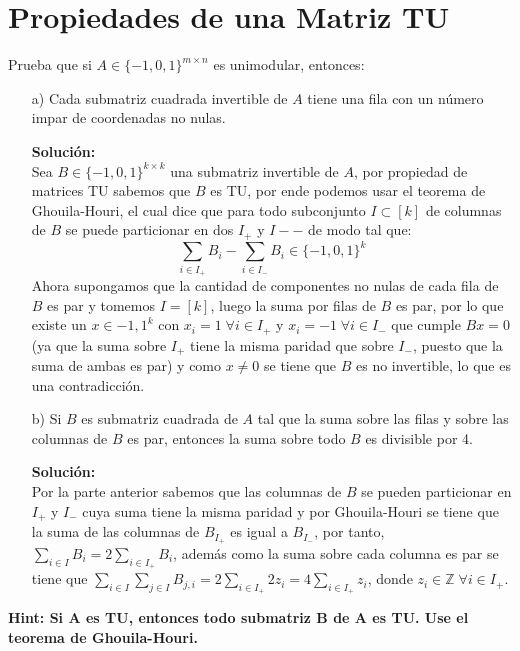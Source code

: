 \documentclass[10pt]{article}
\theoremstyle{plain}
\theoremstyle{definition}
\begin{document}
\section{Propiedades de una Matriz TU}
Prueba que si $A\in\{-1,0,1\}^{m\times n}$ es unimodular, entonces:
\begin{itemize}
    \item[a)] Cada submatriz cuadrada invertible de $A$ tiene una fila con un número impar de coordenadas no nulas.
    
    \textbf{Solución:}\\
    Sea $B\in \{-1,0,1\}^{k\times k}$ una submatriz invertible de $A$, por propiedad de matrices TU sabemos que $B$ es TU, por ende podemos usar el teorema de Ghouila-Houri, el cual dice que para todo subconjunto $I\subset[k]$ de columnas de $B$ se puede particionar en dos $I_{+}$ y $I-{-}$ de modo tal que:
    \begin{equation*}
        \sum_{i\in I_{+}}B_{i}- \sum_{i\in I_{-}}B_{i} \in \{-1, 0, 1\}^{k}
    \end{equation*}
    Ahora supongamos que la cantidad de componentes no nulas de cada fila de $B$ es par y tomemos $I=[k]$, luego la suma por filas de $B$ es par, por lo que existe un $x\in{-1,1}^{k}$ con $x_{i} = 1 \;\forall i \in I_{+}$ y $x_{i} = -1 \;\forall i \in I_{-}$ que cumple $Bx=0$ (ya que la suma sobre $I_{+}$ tiene la misma paridad que sobre $I_{-}$, puesto que la suma de ambas es par) y como $x\neq0$ se tiene que $B$ es no invertible, lo que es una contradicción.
    \item[b)] Si $B$ es submatriz cuadrada de $A$ tal que la suma sobre las filas y sobre las columnas de $B$ es par, entonces la suma sobre todo $B$ es divisible por 4.
    
    \textbf{Solución:}\\
    Por la parte anterior sabemos que las columnas de $B$ se pueden particionar en $I_{+}$ y $I_{-}$ cuya suma tiene la misma paridad y por Ghouila-Houri se tiene que la suma de las columnas de $B_{I_{+}}$ es igual a $B_{I_{-}}$, por tanto, $\sum_{i\in I}B_{i}=2\sum_{i\in I_{+}}B_{i}$, además como la suma sobre cada columna es par se tiene que $\sum_{i\in I}\sum_{j\in I}B_{j,i} = 2\sum_{i\in I_{+}}2 z_{i}=4\sum_{i\in I_{+}}z_{i}$, donde $z_{i}\in\mathbb{Z} \;\forall i \in I_{+}$.
      
\end{itemize}
\textbf{Hint: Si A es TU, entonces todo submatriz B de A es TU. Use el teorema de Ghouila-Houri.}
\end{document}
